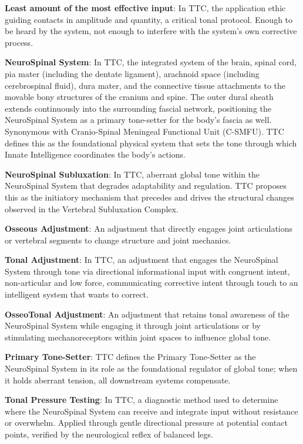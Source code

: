\documentclass[11pt,letterpaper]{article}
\begin{document}
\textbf{Least amount of the most effective input}: In TTC, the application ethic guiding contacts in amplitude and quantity, a critical tonal protocol. Enough to be heard by the system, not enough to interfere with the system's own corrective process.


\textbf{NeuroSpinal System}: In TTC, the integrated system of the brain, spinal cord, pia mater (including the dentate ligament), arachnoid space (including cerebrospinal fluid), dura mater, and the connective tissue attachments to the movable bony structures of the cranium and spine. The outer dural sheath extends continuously into the surrounding fascial network, positioning the NeuroSpinal System as a primary tone-setter for the body's fascia as well. Synonymous with Cranio-Spinal Meningeal Functional Unit (C-SMFU). TTC defines this as the foundational physical system that sets the tone through which Innate Intelligence coordinates the body's actions.


\textbf{NeuroSpinal Subluxation}: In TTC, aberrant global tone within the NeuroSpinal System that degrades adaptability and regulation. TTC proposes this as the initiatory mechanism that precedes and drives the structural changes observed in the Vertebral Subluxation Complex.


\textbf{Osseous Adjustment}: An adjustment that directly engages joint articulations or vertebral segments to change structure and joint mechanics.


\textbf{Tonal Adjustment}: In TTC, an adjustment that engages the NeuroSpinal System through tone via directional informational input with congruent intent, non-articular and low force, communicating corrective intent through touch to an intelligent system that wants to correct.


\textbf{OsseoTonal Adjustment}: An adjustment that retains tonal awareness of the NeuroSpinal System while engaging it through joint articulations or by stimulating mechanoreceptors within joint spaces to influence global tone.


\textbf{Primary Tone-Setter}: TTC defines the Primary Tone-Setter as the NeuroSpinal System in its role as the foundational regulator of global tone; when it holds aberrant tension, all downstream systems compensate.


\textbf{Tonal Pressure Testing}: In TTC, a diagnostic method used to determine where the NeuroSpinal System can receive and integrate input without resistance or overwhelm. Applied through gentle directional pressure at potential contact points, verified by the neurological reflex of balanced legs.
\end{document}
